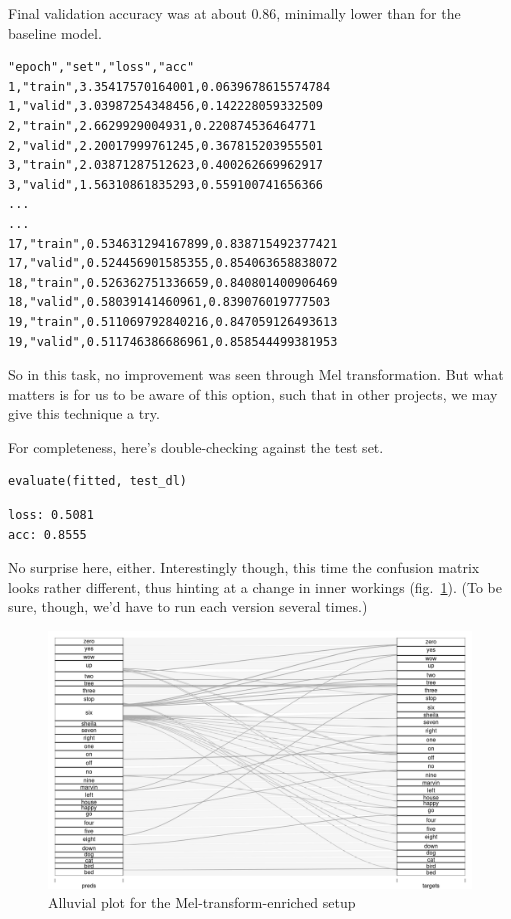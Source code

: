 \documentclass[
  letterpaper,
]{krantz}
\begin{document}
Final validation accuracy was at about 0.86, minimally lower than for
the baseline model.

\begin{verbatim}
"epoch","set","loss","acc"
1,"train",3.35417570164001,0.0639678615574784
1,"valid",3.03987254348456,0.142228059332509
2,"train",2.6629929004931,0.220874536464771
2,"valid",2.20017999761245,0.367815203955501
3,"train",2.03871287512623,0.400262669962917
3,"valid",1.56310861835293,0.559100741656366
...
...
17,"train",0.534631294167899,0.838715492377421
17,"valid",0.524456901585355,0.854063658838072
18,"train",0.526362751336659,0.840801400906469
18,"valid",0.58039141460961,0.839076019777503
19,"train",0.511069792840216,0.847059126493613
19,"valid",0.511746386686961,0.858544499381953
\end{verbatim}

So in this task, no improvement was seen through Mel transformation. But
what matters is for us to be aware of this option, such that in other
projects, we may give this technique a try.

For completeness, here's double-checking against the test set.

\begin{verbatim}
evaluate(fitted, test_dl)
\end{verbatim}

\begin{verbatim}
loss: 0.5081
acc: 0.8555
\end{verbatim}

No surprise here, either. Interestingly though, this time the confusion
matrix looks rather different, thus hinting at a change in inner
workings (fig.~\ref{fig-audio-alluvial-mel}). (To be sure, though, we'd
have to run each version several times.)

\begin{figure}[H]

{\centering \includegraphics{images/audio-alluvial-mel.png}

}

\caption{\label{fig-audio-alluvial-mel}Alluvial plot for the
Mel-transform-enriched setup}

\end{figure}
\end{document}
